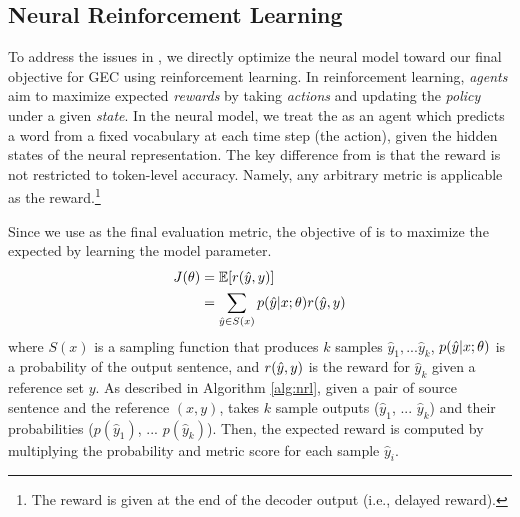 \subsection{Neural Reinforcement Learning}
\vspace{-1mm}
\setlength{\abovedisplayskip}{4.0pt} %
\setlength{\belowdisplayskip}{4.0pt} %
To address the issues in \mle, we directly optimize the neural \encdec model toward our final objective for GEC using reinforcement learning.
In reinforcement learning, {\em agents} aim to maximize expected {\em rewards} by taking {\em actions} and updating the {\em policy} under a given {\em state}.
In the neural \encdec model, we treat the \encdec as an agent which predicts a word from a fixed vocabulary at each time step (the action), given the hidden states of the neural \encdec representation.
The key difference from \mle is that the reward is not restricted to token-level accuracy. 
Namely, any arbitrary metric is applicable as the reward.\footnote{The reward is given at the end of the decoder output (i.e., delayed reward).}

Since we use \metric as the final evaluation metric, the objective of \proposed is to maximize the expected \metric by learning the model parameter. 
\begin{align}
\label{eq:j}
J(\theta) &= \mathbb{E}[r(\hat{y},y)] \nonumber \\
    &= \sum_{\hat{y} \in S(x)} p(\hat{y}| x;\theta) r(\hat{y},y)
\end{align}
where $S(x)$ is a sampling function that produces $k$ samples $\hat{y}_1, ... \hat{y}_k$, $p(\hat{y}| x;\theta)$ is a probability of the output sentence, and $r(\hat{y},y)$ is the reward for $\hat{y}_k$ given a reference set $y$.
As described in Algorithm \ref{alg:nrl}, given a pair of source sentence and the reference $(x, y)$, \proposed takes $k$ sample outputs ($\hat{y}_1$, ... $\hat{y}_k$) and their probabilities ($p(\hat{y}_1)$, ... $p(\hat{y}_k)$).
Then, the expected reward is computed by multiplying the probability and metric score for each sample $\hat{y}_i$.

